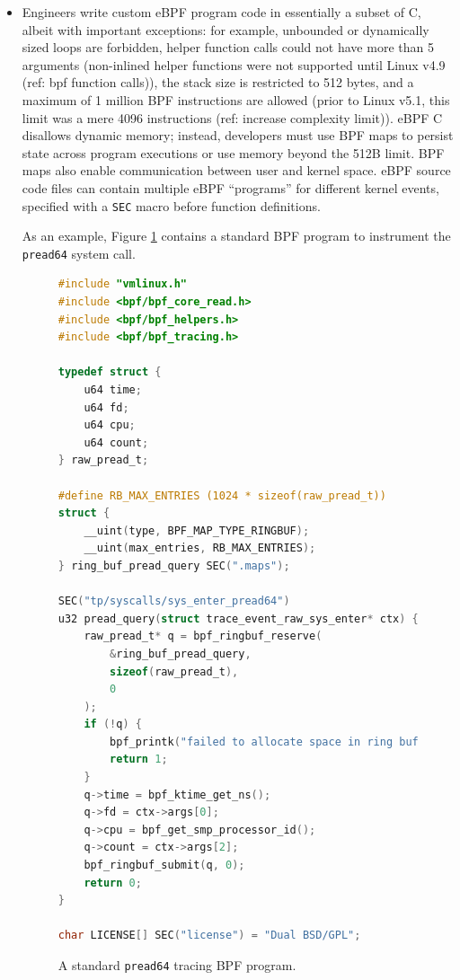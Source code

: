 \begin{itemize}
    \item Engineers write custom eBPF program code in essentially a subset of C, albeit with
        important exceptions: for example, unbounded or dynamically sized loops are forbidden,
        helper function calls could not have more than 5 arguments (non-inlined helper functions
        were not supported until Linux v4.9 (ref: bpf function calls)), the stack size is restricted
        to 512 bytes, and a maximum of 1 million BPF instructions are allowed (prior to Linux v5.1,
        this limit was a mere 4096 instructions (ref: increase complexity limit)). eBPF C disallows
        dynamic memory; instead, developers must use BPF maps to persist state across program
        executions or use memory beyond the 512B limit. BPF maps also enable communication between
        user and kernel space. eBPF source code files can contain multiple eBPF ``programs'' for
        different kernel events, specified with a \texttt{SEC} macro before function definitions.

        As an example, Figure \ref{code:pread64-unopt} contains a standard BPF program to instrument
        the \texttt{pread64} system call.
\begin{figure}
\begin{lstlisting}[language=C]
#include "vmlinux.h"
#include <bpf/bpf_core_read.h>
#include <bpf/bpf_helpers.h>
#include <bpf/bpf_tracing.h>

typedef struct {
    u64 time;
    u64 fd;
    u64 cpu;
    u64 count;
} raw_pread_t;

#define RB_MAX_ENTRIES (1024 * sizeof(raw_pread_t))
struct {
    __uint(type, BPF_MAP_TYPE_RINGBUF);
    __uint(max_entries, RB_MAX_ENTRIES);
} ring_buf_pread_query SEC(".maps");

SEC("tp/syscalls/sys_enter_pread64")
u32 pread_query(struct trace_event_raw_sys_enter* ctx) {
    raw_pread_t* q = bpf_ringbuf_reserve(
        &ring_buf_pread_query,
        sizeof(raw_pread_t),
        0
    );
    if (!q) {
        bpf_printk("failed to allocate space in ring buffer");
        return 1;
    }
    q->time = bpf_ktime_get_ns();
    q->fd = ctx->args[0];
    q->cpu = bpf_get_smp_processor_id();
    q->count = ctx->args[2];
    bpf_ringbuf_submit(q, 0);
    return 0;
}

char LICENSE[] SEC("license") = "Dual BSD/GPL";
\end{lstlisting}
\caption{A standard \texttt{pread64} tracing BPF program.}
\label{code:pread64-unopt}
\end{figure}


\end{itemize}
